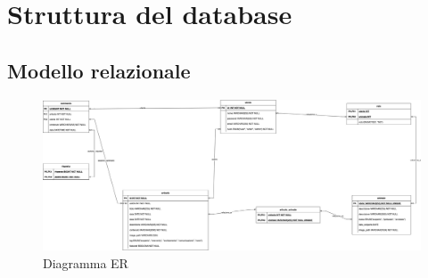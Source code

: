 \section{Struttura del database}

\subsection{Modello relazionale}
    \begin{figure}[h]
        \centering
        \includegraphics[width=1.0\textwidth]{assets/eLusive_DB.jpg}
        \caption{Diagramma ER}
        \label{fig:diagramma_er}
    \end{figure}

